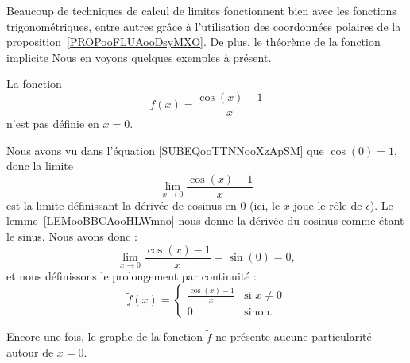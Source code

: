 Beaucoup de techniques de calcul de limites fonctionnent bien avec les fonctions trigonométriques, entre autres grâce à l'utilisation des coordonnées polaires de la proposition~\ref{PROPooFLUAooDsyMXO}. De plus, le théorème de la fonction implicite Nous en voyons quelques exemples à présent.

\begin{example} \label{ExQWHooGddTLE}
    La fonction
    \begin{equation}
        f(x)=\frac{ \cos(x)-1 }{ x }
    \end{equation}
    n'est pas définie en \( x=0\).

    Nous avons vu dans l'équation \eqref{SUBEQooTTNNooXzApSM} que \( \cos(0)=1\), donc la limite
    \begin{equation}
        \lim_{x\to 0} \frac{ \cos(x)-1 }{ x }
    \end{equation}
    est la limite définissant la dérivée de cosinus en \( 0\) (ici, le \( x\) joue le rôle de \( \epsilon\)). Le lemme~\ref{LEMooBBCAooHLWmno} nous donne la dérivée du cosinus comme étant le sinus. Nous avons donc :
    \begin{equation}
        \lim_{x\to 0} \frac{ \cos(x)-1 }{ x }=\sin(0)=0,
    \end{equation}
    et nous définissons le prolongement par continuité :
    \begin{equation}
        \tilde f(x)=\begin{cases}
            \frac{ \cos(x)-1 }{ x }    &   \text{si } x\neq 0\\
            0    &    \text{sinon}.
        \end{cases}
    \end{equation}

    Encore une fois, le graphe de la fonction \(\tilde f\) ne présente aucune particularité autour de \( x=0\).
    \begin{center}
        
    \end{center}
\end{example}

